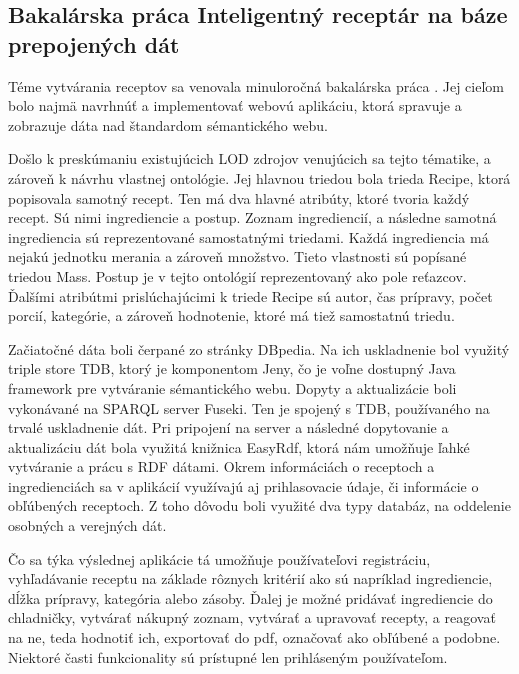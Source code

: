 \subsection{Bakalárska práca Inteligentný receptár na báze prepojených dát}
Téme vytvárania receptov sa venovala minuloročná bakalárska práca \cite{bakalarka}. Jej cieľom
bolo najmä navrhnúť a implementovať webovú aplikáciu, ktorá spravuje a zobrazuje
dáta nad štandardom sémantického webu.

Došlo k preskúmaniu existujúcich LOD zdrojov venujúcich sa tejto tématike, a
zároveň k návrhu vlastnej ontológie. Jej hlavnou triedou bola trieda Recipe, ktorá popisovala samotný recept. Ten má dva hlavné atribúty, ktoré tvoria každý recept. Sú
nimi ingrediencie a postup. Zoznam ingrediencií, a následne samotná ingrediencia sú
reprezentované samostatnými triedami. Každá ingrediencia má nejakú jednotku merania a zároveň množstvo. Tieto vlastnosti sú popísané triedou Mass. Postup je v tejto
ontológií reprezentovaný ako pole reťazcov. Ďalšími atribútmi prislúchajúcimi k triede
Recipe sú autor, čas prípravy, počet porcií, kategórie, a zároveň hodnotenie, ktoré má
tiež samostatnú triedu.

Začiatočné dáta boli čerpané zo stránky DBpedia. Na ich uskladnenie bol využitý
triple store TDB, ktorý je komponentom Jeny, čo je voľne dostupný Java framework
pre vytváranie sémantického webu. Dopyty a aktualizácie boli vykonávané na SPARQL
server Fuseki. Ten je spojený s TDB, používaného na trvalé uskladnenie dát. Pri pripojení na server a následné dopytovanie a aktualizáciu dát bola využitá knižnica EasyRdf,
ktorá nám umožňuje ľahké vytváranie a prácu s RDF dátami. Okrem informáciách o
receptoch a ingredienciách sa v aplikácií využívajú aj prihlasovacie údaje, či informácie
o obľúbených receptoch. Z toho dôvodu boli využité dva typy databáz, na oddelenie
osobných a verejných dát.

Čo sa týka výslednej aplikácie tá umožňuje používateľovi registráciu, vyhľadávanie receptu na základe rôznych kritérií ako sú napríklad ingrediencie, dĺžka prípravy,
kategória alebo zásoby. Ďalej je možné pridávať ingrediencie do chladničky, vytvárať
nákupný zoznam, vytvárať a upravovať recepty, a reagovať na ne, teda hodnotiť ich, exportovať do pdf, označovať ako obľúbené a podobne. Niektoré časti funkcionality sú
prístupné len prihláseným používateľom.